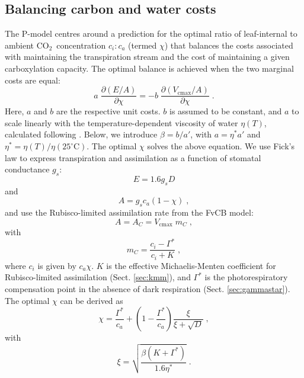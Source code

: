\documentclass[gmd, manuscript]{copernicus}
\newcommand{\coo}{CO$_2$}
\begin{document}
\subsection{Balancing carbon and water costs}
\label{sec:watercarbon}
The P-model centres around a prediction for the optimal ratio of leaf-internal to ambient \coo\ concentration $c_i:c_a$ (termed $\chi$) that balances the costs associated with maintaining the transpiration stream and the cost of maintaining a given carboxylation capacity. The optimal balance is achieved when the two marginal costs are equal: 
\begin{equation}
\label{eq:optimality_chi}
a \; \frac{\partial (E/A)}{\partial \chi} = -b \; \frac{\partial (V_{\mathrm{cmax}}/A)}{\partial \chi}\;.
\end{equation}
Here, $a$ and $b$ are the respective unit costs. $b$ is assumed to be constant, and $a$ to scale linearly with the temperature-dependent viscosity of water $\eta(T)$, calculated following \citet{huber09}. Below, we introduce $\beta = b / a'$, with $a = \eta^\ast a'$ and $\eta^\ast = \eta(T) / \eta(25^{\circ}\text{C})$. The optimal $\chi$ solves the above equation. We use Fick's law \citep{fick1855} to express transpiration and assimilation as a function of stomatal conductance $g_s$: 
\begin{equation}
\label{eq:egs}
    E = 1.6 g_s D
\end{equation}
and 
\begin{equation}
\label{eq:ags}
    A = g_s c_a (1-\chi) \;,
\end{equation}
and use the Rubisco-limited assimilation rate from the FvCB model:
\begin{equation}
\label{eq:ac}
    A = A_C = V_{\mathrm{cmax}} \; m_C \;,
\end{equation}
with
\begin{equation}
\label{eq:mc}
   m_C = \frac{c_i - \Gamma^{\ast}}{c_i + K}\;,
\end{equation}
where $c_i$ is given by $c_a \chi$. $K$ is the effective Michaelis-Menten coefficient for Rubisco-limited assimilation (Sect. \ref{sec:kmm}), and $\Gamma^{\ast}$ is the photorespiratory compensation point in the absence of dark respiration (Sect. \ref{sec:gammastar}). The optimal $\chi$ can be derived as
\begin{equation}
\label{eq:chiopt}
\chi = \frac{\Gamma^{\ast}}{c_a} + \left(1- \frac{\Gamma^{\ast}}{c_a}\right) \frac{\xi}{\xi + \sqrt{D}}\;,
\end{equation}
with 
\begin{equation}
\label{eq:xi}
\xi = \sqrt{\frac{\beta (K+\Gamma^{\ast})}{1.6 \eta^{\ast}}}\;.
\end{equation}
\end{document}
